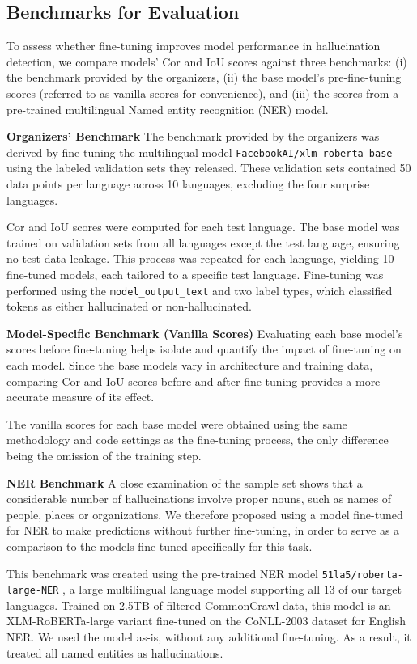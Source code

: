 \documentclass[11pt]{article}
\begin{document}
   
\subsection{Benchmarks for Evaluation}
To assess whether fine-tuning improves model performance in hallucination detection, we compare models’ Cor and IoU scores against three benchmarks: (i) the benchmark provided by the organizers, (ii) the base model’s pre-fine-tuning scores (referred to as vanilla scores for convenience), and (iii) the scores from a pre-trained multilingual Named entity recognition (NER) model. 

\textbf{Organizers' Benchmark}
The benchmark provided by the organizers was derived by fine-tuning the multilingual model \texttt{FacebookAI/xlm-roberta-base} \cite{DBLP:journals/corr/abs-1911-02116} using the labeled validation sets they released. These validation sets contained 50 data points per language across 10 languages, excluding the four surprise languages.

Cor and IoU scores were computed for each test language. The base model was trained on validation sets from all languages except the test language, ensuring no test data leakage. This process was repeated for each language, yielding 10 fine-tuned models, each tailored to a specific test language. Fine-tuning was performed using the \texttt{model\_output\_text} and two label types, which classified tokens as either hallucinated or non-hallucinated.




\textbf{Model-Specific Benchmark (Vanilla Scores)}
Evaluating each base model’s scores before fine-tuning helps isolate and quantify the impact of fine-tuning on each model. Since the base models vary in architecture and training data, comparing Cor and IoU scores before and after fine-tuning provides a more accurate measure of its effect. 

The vanilla scores for each base model were obtained using the same methodology and code settings as the fine-tuning process, the only difference being the omission of the training step.

\textbf{NER Benchmark}
A close examination of the sample set shows that a considerable number of hallucinations involve proper nouns, such as names of people, places or organizations. We therefore proposed using a model fine-tuned for NER to make predictions without further fine-tuning, in order to serve as a comparison to the models fine-tuned specifically for this task.

This benchmark was created using the pre-trained NER model \texttt{51la5/roberta-large-NER} \cite{conneau2019unsupervised}, a large multilingual language model supporting all 13 of our target languages. Trained on 2.5TB of filtered CommonCrawl data, this model is an XLM-RoBERTa-large variant fine-tuned on the CoNLL-2003 dataset for English NER. We used the model as-is, without any additional fine-tuning. As a result, it treated all named entities as hallucinations.
\end{document}
